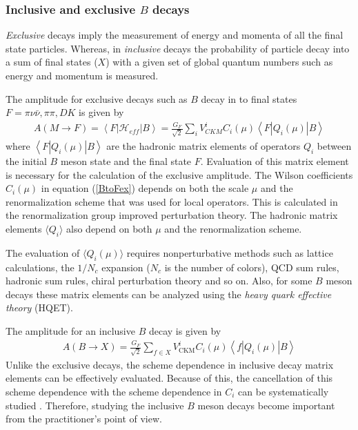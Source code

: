 \subsubsection{Inclusive and exclusive $B$ decays}
\vspace{-0.3cm}
\textit{Exclusive} decays imply the measurement of energy and momenta of all the final state particles. Whereas, in \textit{inclusive} decays the probability of particle decay into a sum of final states ($X$) with a given set of global quantum numbers such as energy and momentum is measured.\par
The amplitude for exclusive decays such as $B$ decay in to final states $F=\pi \nu \bar{\nu}, \pi \pi, D K$ is given by 
\begin{eqnarray}\label{BtoFex}
A(M \rightarrow F)=\left\langle F\left|\mathcal{H}_{e f f}\right| B\right\rangle=\frac{G_{F}}{\sqrt{2}} \sum_{i} V_{C K M}^{i} C_{i}(\mu)\left\langle F\left|Q_{i}(\mu)\right| B\right\rangle
\end{eqnarray} 
where $\left\langle F\left|Q_{i}(\mu)\right| B\right\rangle$ are the hadronic matrix elements of operators $Q_i$ between the initial $B$ meson state and the final state $F$. Evaluation of this matrix element is necessary for the calculation of the exclusive amplitude. The Wilson coefficients $C_i(\mu)$ in equation (\ref{BtoFex}) depends on both the scale $\mu$ and the renormalization scheme that was used for local operators. This is calculated in the renormalization group improved perturbation theory. The hadronic matrix elements $\langle Q_i\rangle$ also depend on both $\mu$ and the renormalization scheme. \par
The evaluation of $\langle Q_i(\mu)\rangle$ requires nonperturbative methods such as lattice calculations, the $1/N_c$ expansion ($N_c$ is the number of colors), QCD sum rules, hadronic sum rules, chiral perturbation theory and so on. Also, for some $B$ meson decays these matrix elements can be analyzed using the \textit{heavy quark effective theory} (HQET).\par
The amplitude for an inclusive $B$ decay is given by
\begin{eqnarray}\label{BtoXinc}
A(B \rightarrow X)=\frac{G_{F}}{\sqrt{2}} \sum_{f \in X} V_{\mathrm{CKM}}^{i} C_{i}(\mu)\left\langle f\left|Q_{i}(\mu)\right| B\right\rangle
\end{eqnarray} 
Unlike the exclusive decays, the scheme dependence in inclusive decay matrix elements can be effectively evaluated. Because of this, the cancellation of this scheme dependence with the scheme dependence in $C_i$ can be systematically studied \cite{Neubert:1993ch}. Therefore, studying the inclusive $B$ meson decays become important from the practitioner's point of view.\par
